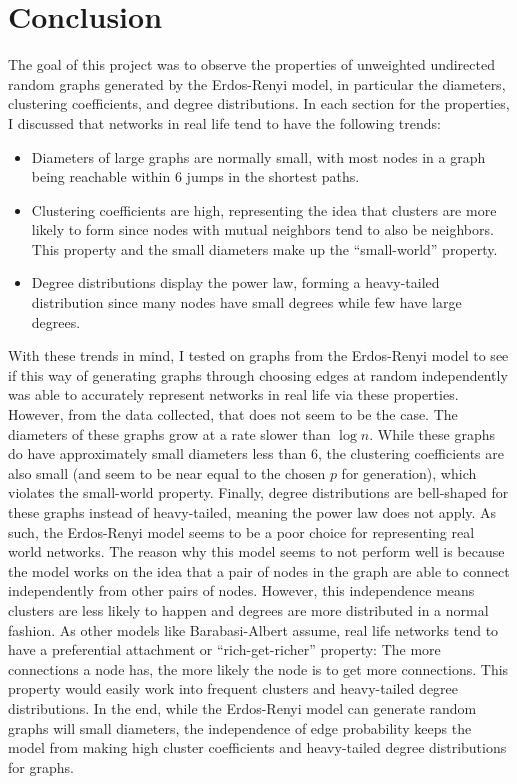 \documentclass{article}
\begin{document}
\section{Conclusion}
    The goal of this project was to observe the properties of unweighted 
    undirected random graphs generated by the Erdos-Renyi model, in particular
    the diameters, clustering coefficients, and degree distributions. In each
    section for the properties, I discussed that networks in real life tend 
    to have the following trends:
    \begin{itemize}
        \item Diameters of large graphs are normally small, with most nodes in 
            a graph being reachable within 6 jumps in the shortest paths.
        \item Clustering coefficients are high, representing the idea that
            clusters are more likely to form since nodes with mutual neighbors
            tend to also be neighbors. This property and the small diameters 
            make up the ``small-world'' property.
        \item Degree distributions display the power law, forming a 
            heavy-tailed distribution since many nodes have small degrees while
            few have large degrees.
    \end{itemize}
    \noindent With these trends in mind, I tested on graphs from the Erdos-Renyi
    model to see if this way of generating graphs through choosing edges at
    random independently was able to accurately represent networks in real life
    via these properties.
    \nextblurb
    However, from the data collected, that does not seem to be the case. The
    diameters of these graphs grow at a rate slower than $\log{n}$. While
    these graphs do have approximately small diameters less than 6, the 
    clustering coefficients are also small (and seem to be near equal to the 
    chosen $p$ for generation), which violates the small-world property. 
    Finally, degree distributions are bell-shaped for these graphs instead of
    heavy-tailed, meaning the power law does not apply. As such, the Erdos-Renyi
    model seems to be a poor choice for representing real world networks.
    \nextblurb
    The reason why this model seems to not perform well is because the model 
    works on the idea that a pair of nodes in the graph are able to connect
    independently from other pairs of nodes. However, this independence means
    clusters are less likely to happen and degrees are more distributed in a
    normal fashion. As other models like Barabasi-Albert assume, real life
    networks tend to have a preferential attachment or ``rich-get-richer''
    property: The more connections a node has, the more likely the node is to
    get more connections. This property would easily work into frequent clusters 
    and heavy-tailed degree distributions. In the end, while the Erdos-Renyi
    model can generate random graphs will small diameters, the independence of
    edge probability keeps the model from making high cluster coefficients
    and heavy-tailed degree distributions for graphs.
\end{document}
